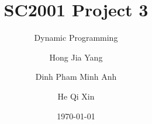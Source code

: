 \documentclass{beamer}
\title{SC2001 Project 3}
\subtitle{Dynamic Programming}
\author[Hong, Dinh, He]{Hong Jia Yang \and Dinh Pham Minh Anh \and He Qi Xin}
\institute{Team 4}
\date{\today}
\begin{document}
\begin{frame}
	\titlepage
\end{frame}
\end{document}
